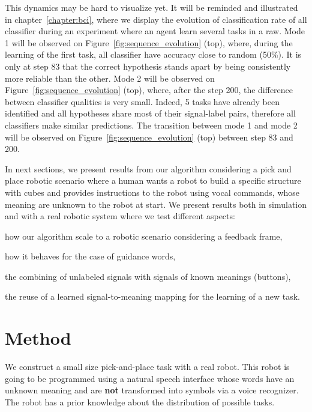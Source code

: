 This dynamics may be hard to visualize yet. It will be reminded and illustrated in chapter~\ref{chapter:bci}, where we display the evolution of classification rate of all classifier during an experiment where an agent learn several tasks in a raw. Mode 1 will be observed on Figure~\ref{fig:sequence_evolution} (top), where, during the learning of the first task, all classifier have accuracy close to random (50\%). It is only at step 83 that the correct hypothesis stands apart by being consistently more reliable than the other. Mode 2 will be observed on Figure~\ref{fig:sequence_evolution} (top), where, after the step 200, the difference between classifier qualities is very small. Indeed, 5 tasks have already been identified and all hypotheses share most of their signal-label pairs, therefore all classifiers make similar predictions. The transition between mode 1 and mode 2 will be observed on Figure~\ref{fig:sequence_evolution} (top) between step 83 and 200.

\transition

In next sections, we present results from our algorithm considering a pick and place robotic scenario where a human wants a robot to build a specific structure with cubes and provides instructions to the robot using vocal commands, whose meaning are unknown to the robot at start. We present results both in simulation and with a real robotic system where we test different aspects: \begin{inparaenum}[(a)] \item how our algorithm scale to a robotic scenario considering a feedback frame, \item how it behaves for the case of guidance words, \item the combining of unlabeled signals with signals of known meanings (buttons), \item the reuse of a learned signal-to-meaning mapping for the learning of a new task. \end{inparaenum}

\section{Method}

We construct a small size pick-and-place task with a real robot. This robot is going to be programmed using a natural speech interface whose words have an unknown meaning and are \textbf{not} transformed into symbols via a voice recognizer. The robot has a prior knowledge about the distribution of possible tasks.

